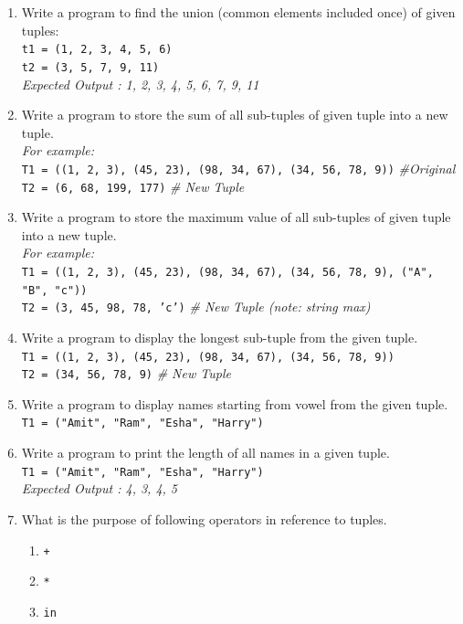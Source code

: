 \documentclass[11pt,a4paper]{article}
\begin{document}
\begin{enumerate}[label=\textbf{Q\arabic*.}]
\item Write a program to find the union (common elements included once) of given tuples:\\
\texttt{t1 = (1, 2, 3, 4, 5, 6)}\\
\texttt{t2 = (3, 5, 7, 9, 11)}\\
\textit{Expected Output : 1, 2, 3, 4, 5, 6, 7, 9, 11}

\item Write a program to store the sum of all sub-tuples of given tuple into a new tuple.\\
\textit{For example:}\\
\texttt{T1 = ((1, 2, 3), (45, 23), (98, 34, 67), (34, 56, 78, 9))} \textit{\#Original}\\
\texttt{T2 = (6, 68, 199, 177)} \textit{\# New Tuple}

\item Write a program to store the maximum value of all sub-tuples of given tuple into a new tuple.\\
\textit{For example:}\\
\texttt{T1 = ((1, 2, 3), (45, 23), (98, 34, 67), (34, 56, 78, 9), ("A", "B", "c"))}\\
\texttt{T2 = (3, 45, 98, 78, 'c')} \textit{\# New Tuple (note: string max)}

\item Write a program to display the longest sub-tuple from the given tuple.\\
\texttt{T1 = ((1, 2, 3), (45, 23), (98, 34, 67), (34, 56, 78, 9))}\\
\texttt{T2 = (34, 56, 78, 9)} \textit{\# New Tuple}

\item Write a program to display names starting from vowel from the given tuple.\\
\texttt{T1 = ("Amit", "Ram", "Esha", "Harry")}

\item Write a program to print the length of all names in a given tuple.\\
\texttt{T1 = ("Amit", "Ram", "Esha", "Harry")}\\
\textit{Expected Output : 4, 3, 4, 5}

\item What is the purpose of following operators in reference to tuples.
\begin{enumerate}
    \item \texttt{+}
    \item \texttt{*}
    \item \texttt{in}
\end{enumerate}


\end{enumerate}
\end{document}
